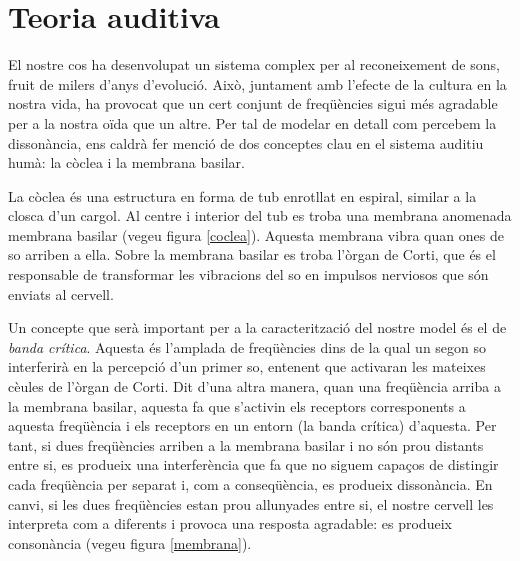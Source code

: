 \documentclass{article}
\theoremstyle{math}
\theoremstyle{TheoremNum}
\newcommand{\0}{\ensuremath{\vb{0}}}
\begin{document}
\section{Teoria auditiva}\label{teoria_auditiva}
El nostre cos ha desenvolupat un sistema complex per al reconeixement de sons, fruit de milers d'anys d'evolució. Això, juntament amb l'efecte de la cultura en la nostra vida, ha provocat que un cert conjunt de freqüències sigui més agradable per a la nostra oïda que un altre. Per tal de modelar en detall com percebem la dissonància, ens caldrà fer menció de dos conceptes clau en el sistema auditiu humà: la còclea i la membrana basilar. \par
La còclea és una estructura en forma de tub enrotllat en espiral, similar a la closca d'un cargol. Al centre i interior del tub es troba una membrana anomenada membrana basilar (vegeu figura \ref{coclea}). Aquesta membrana vibra quan ones de so arriben a ella. Sobre la membrana basilar es troba l'òrgan de Corti, que és el responsable de transformar les vibracions del so en impulsos nerviosos que són enviats al cervell.\par
Un concepte que serà important per a la caracterització del nostre model és el de \textit{banda crítica}. Aquesta és l'amplada de freqüències dins de la qual un segon so interferirà en la percepció d'un primer so, entenent que activaran les mateixes cè\lgem ules de l'òrgan de Corti. Dit d'una altra manera, quan una freqüència arriba a la membrana basilar, aquesta fa que s'activin els receptors corresponents a aquesta freqüència i els receptors en un entorn (la banda crítica) d'aquesta. Per tant, si dues freqüències arriben a la membrana basilar i no són prou distants entre si, es produeix una interferència que fa que no siguem capaços de distingir cada freqüència per separat i, com a conseqüència, es produeix dissonància. En canvi, si les dues freqüències estan prou allunyades entre si, el nostre cervell les interpreta com a diferents i provoca una resposta agradable: es produeix consonància (vegeu figura \ref{membrana}).\par
\end{document}
